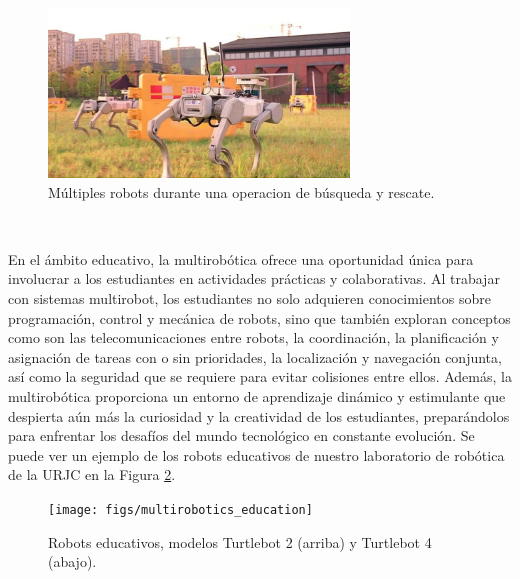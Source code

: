 \begin{figure} [h!]
  \begin{center}
    \includegraphics[width=8cm]{figs/multirobotics_in_search_and_rescue}
  \end{center}
  \caption{Múltiples robots durante una operacion de búsqueda y rescate.}
  \label{fig:multirobots}
\end{figure}\

En el ámbito educativo, la multirobótica ofrece una oportunidad única para
involucrar a los estudiantes en actividades prácticas y colaborativas.
Al trabajar con sistemas multirobot, los estudiantes no solo adquieren
conocimientos sobre programación, control y mecánica de robots, sino que también
exploran conceptos como son las telecomunicaciones entre robots, la coordinación,
la planificación y asignación de tareas con o sin prioridades, la localización y
navegación conjunta, así como la seguridad que se requiere para evitar
colisiones entre ellos.
Además, la multirobótica proporciona un entorno de aprendizaje dinámico y
estimulante que despierta aún más la curiosidad y la creatividad de los
estudiantes, preparándolos para enfrentar los desafíos del mundo tecnológico en
constante evolución.
Se puede ver un ejemplo de los robots educativos de nuestro laboratorio de
robótica de la URJC en la Figura \ref{fig:robots_education}.

\begin{figure} [h!]
  \begin{center}
    \texttt{[image: figs/multirobotics\_education]}
  \end{center}
  \caption{Robots educativos, modelos Turtlebot 2 (arriba) y Turtlebot 4 (abajo).}
  \label{fig:robots_education}
\end{figure}\

